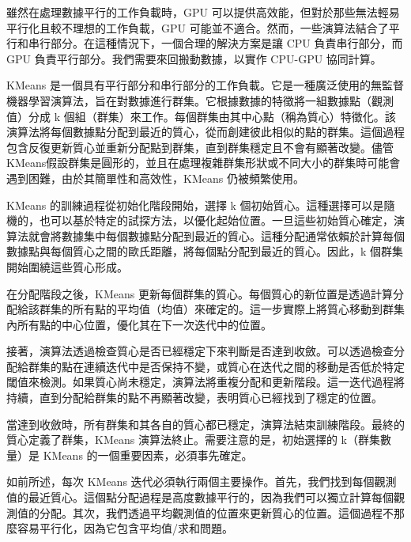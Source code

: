 \vspace{1em}
雖然在處理數據平行的工作負載時，GPU 可以提供高效能，但對於那些無法輕易平行化且較不理想的工作負載，GPU 可能並不適合。然而，一些演算法結合了平行和串行部分。在這種情況下，一個合理的解決方案是讓 CPU 負責串行部分，而 GPU 負責平行部分。我們需要來回搬動數據，以實作 CPU-GPU 協同計算。

\vspace{1em}
KMeans 是一個具有平行部分和串行部分的工作負載。它是一種廣泛使用的無監督機器學習演算法，旨在對數據進行群集。它根據數據的特徵將一組數據點（觀測值）分成 k 個組（群集）來工作。每個群集由其中心點（稱為質心）特徵化。該演算法將每個數據點分配到最近的質心，從而創建彼此相似的點的群集。這個過程包含反復更新質心並重新分配點到群集，直到群集穩定且不會有顯著改變。儘管KMeans假設群集是圓形的，並且在處理複雜群集形狀或不同大小的群集時可能會遇到困難，由於其簡單性和高效性，KMeans 仍被頻繁使用。

\vspace{1em}
KMeans 的訓練過程從初始化階段開始，選擇 k 個初始質心。這種選擇可以是隨機的，也可以基於特定的試探方法，以優化起始位置。一旦這些初始質心確定，演算法就會將數據集中每個數據點分配到最近的質心。這種分配通常依賴於計算每個數據點與每個質心之間的歐氏距離，將每個點分配到最近的質心。因此，k 個群集開始圍繞這些質心形成。

\vspace{1em}
在分配階段之後，KMeans 更新每個群集的質心。每個質心的新位置是透過計算分配給該群集的所有點的平均值（均值）來確定的。這一步實際上將質心移動到群集內所有點的中心位置，優化其在下一次迭代中的位置。

\vspace{1em}
接著，演算法透過檢查質心是否已經穩定下來判斷是否達到收斂。可以透過檢查分配給群集的點在連續迭代中是否保持不變，或質心在迭代之間的移動是否低於特定閾值來檢測。如果質心尚未穩定，演算法將重複分配和更新階段。這一迭代過程將持續，直到分配給群集的點不再顯著改變，表明質心已經找到了穩定的位置。

\vspace{1em}
當達到收斂時，所有群集和其各自的質心都已穩定，演算法結束訓練階段。最終的質心定義了群集，KMeans 演算法終止。需要注意的是，初始選擇的 k（群集數量）是 KMeans 的一個重要因素，必須事先確定。

\vspace{1em}
如前所述，每次 KMeans 迭代必須執行兩個主要操作。首先，我們找到每個觀測值的最近質心。這個點分配過程是高度數據平行的，因為我們可以獨立計算每個觀測值的分配。其次，我們透過平均觀測值的位置來更新質心的位置。這個過程不那麼容易平行化，因為它包含平均值/求和問題。

